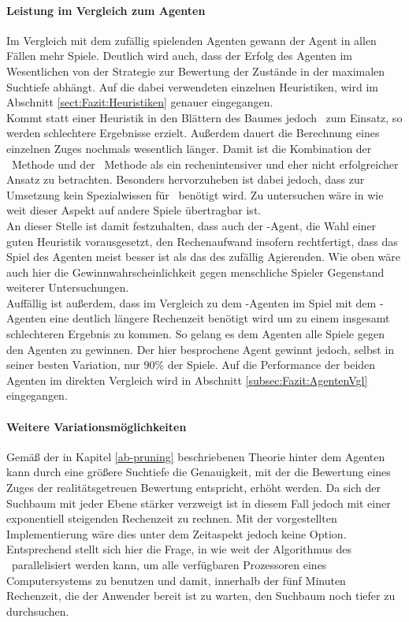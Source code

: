 \paragraph{Leistung im Vergleich zum Agenten }
Im Vergleich mit dem zufällig spielenden Agenten gewann der Agent \mxZitat{\abp} in allen Fällen mehr Spiele. Deutlich wird auch, dass der Erfolg des Agenten im Wesentlichen von der Strategie zur Bewertung der Zustände in der maximalen Suchtiefe abhängt. Auf die dabei verwendeten einzelnen Heuristiken, wird im Abschnitt \ref{sect:Fazit:Heuristiken} genauer eingegangen.
\\Kommt statt einer Heuristik in den Blättern des Baumes jedoch \mc\ zum Einsatz, so werden schlechtere Ergebnisse erzielt. Außerdem dauert die Berechnung eines einzelnen Zuges nochmals wesentlich länger. Damit ist die Kombination der \ababs\ Methode und der \mc\ Methode als ein rechenintensiver und eher nicht erfolgreicher Ansatz zu betrachten. Besonders hervorzuheben ist dabei jedoch, dass zur Umsetzung kein Spezialwissen für \ot\ benötigt wird. Zu untersuchen wäre in wie weit dieser Aspekt auf andere Spiele übertragbar ist.
\\An dieser Stelle ist damit festzuhalten, dass auch der \mxZitat{\abp}-Agent, die Wahl einer guten Heuristik vorausgesetzt, den Rechenaufwand insofern rechtfertigt, dass das Spiel des Agenten meist besser ist als das des zufällig Agierenden. Wie oben wäre auch hier die Gewinnwahrscheinlichkeit gegen menschliche Spieler Gegenstand weiterer Untersuchungen.
\\Auffällig ist außerdem, dass im Vergleich zu dem \mxZitat{\mc}-Agenten im Spiel mit dem -Agenten eine deutlich längere Rechenzeit benötigt wird um zu einem insgesamt schlechteren Ergebnis zu kommen. So gelang es dem Agenten \mxZitat{\mc} alle Spiele gegen den Agenten  zu gewinnen. Der hier besprochene Agent gewinnt jedoch, selbst in seiner besten Variation, nur $90\%$ der Spiele. Auf die Performance der beiden Agenten im direkten Vergleich wird in Abschnitt \ref{subsec:Fazit:AgentenVgl} eingegangen.
\paragraph{Weitere Variationsmöglichkeiten}
Gemäß der in Kapitel \ref{ab-pruning} beschriebenen Theorie hinter dem Agenten \mxZitat{\abp} kann durch eine größere Suchtiefe  die Genauigkeit, mit der die Bewertung eines Zuges der realitätsgetreuen Bewertung entspricht, erhöht werden. Da sich der Suchbaum mit jeder Ebene stärker verzweigt ist in diesem Fall jedoch mit einer exponentiell steigenden Rechenzeit zu rechnen. Mit der vorgestellten Implementierung wäre dies unter dem Zeitaspekt jedoch keine Option. Entsprechend stellt sich hier die Frage, in wie weit der Algorithmus des \ababs\ parallelisiert werden kann, um alle verfügbaren Prozessoren eines Computersystems zu benutzen und damit, innerhalb der fünf Minuten Rechenzeit, die der Anwender bereit ist zu warten, den Suchbaum noch tiefer zu durchsuchen.


